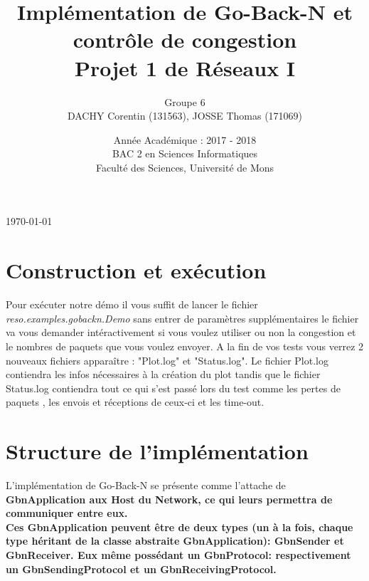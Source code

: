 \documentclass[11pt]{article}
\begin{document}
\title{ \huge
  Implémentation de Go-Back-N et contrôle de congestion \\
  \Large Projet 1 de Réseaux I \\}

\author{Groupe 6\\DACHY Corentin (131563), JOSSE Thomas (171069)}

\date{Année Académique : 2017 - 2018\\
BAC 2 en Sciences Informatiques\\
\vspace{1cm}
Faculté des Sciences, Université de Mons}

\maketitle

\bigskip
\begin{center} \today \end{center}

\newpage

\section{Construction et exécution}
 Pour exécuter notre démo il vous suffit de lancer le fichier \textit{reso.examples.gobackn.Demo} sans entrer de paramètres supplémentaires le fichier va vous demander intéractivement si vous voulez utiliser ou non la congestion et le nombres de paquets que vous voulez envoyer.
 A la fin de vos tests vous verrez 2 nouveaux fichiers apparaître : "Plot.log" et "Status.log". Le fichier Plot.log contiendra les infos nécessaires à la création du plot tandis que le fichier Status.log contiendra tout ce qui s'est passé lors du test comme les pertes de paquets , les envois et réceptions de ceux-ci et les time-out.
\section{Structure de l'implémentation}

L'implémentation de Go-Back-N se présente comme l'attache de \bfseries GbnApplication \mdseries aux Host du Network, ce qui leurs permettra de communiquer entre eux. \\
Ces GbnApplication peuvent être de deux types (un à la fois, chaque type héritant de la classe abstraite GbnApplication): \bfseries GbnSender \mdseries  et \bfseries GbnReceiver\mdseries. Eux même possédant un \bfseries GbnProtocol\mdseries : respectivement un \bfseries GbnSendingProtocol \mdseries et un \bfseries GbnReceivingProtocol\mdseries .
\end{document}
